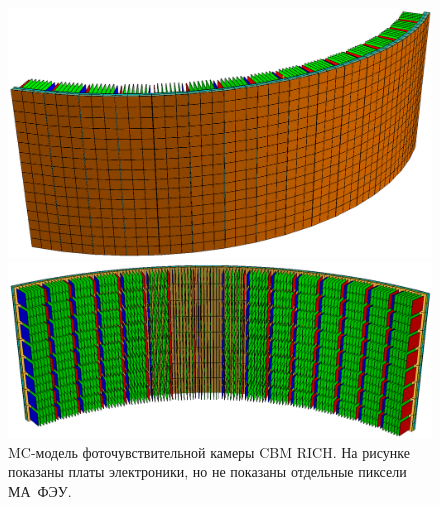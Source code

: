 \begin{figure}[H]
\begin{minipage}[b]{0.495\textwidth}
\includegraphics[width=1.0\textwidth]{pictures/Camera_pmts.png}
\end{minipage}
\hspace{0.01\textwidth}
\begin{minipage}[b]{0.495\textwidth}
\includegraphics[width=1.0\textwidth]{pictures/Camera_back.png}
\end{minipage}
\caption{MC-модель фоточувствительной камеры CBM RICH. На рисунке показаны платы электроники, но не показаны отдельные пиксели МА~ФЭУ.}
\label{fig:geoMCcamera}
\end{figure}



